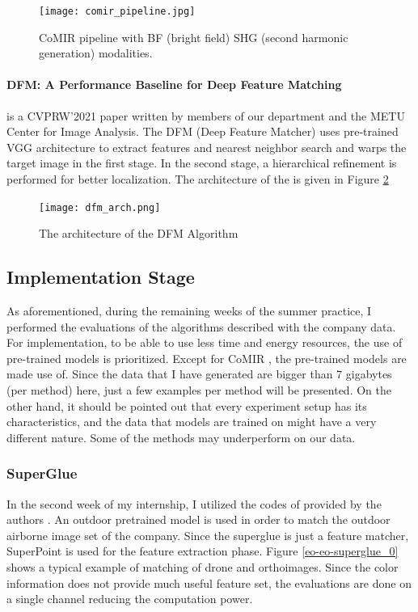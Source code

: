 \documentclass[letterpaper,12pt]{article}
\begin{document}
\begin{figure}[H]
    \centering
    \texttt{[image: comir\_pipeline.jpg]}
    \caption{CoMIR pipeline with BF (bright field) SHG (second harmonic generation) modalities.}
    \label{comir_pip}
\end{figure} 


\paragraph{DFM: A Performance Baseline for Deep Feature Matching}
\cite{Efe_2021_CVPR} is a CVPRW'2021 paper written by members of our department and the METU Center for Image Analysis. The DFM (Deep Feature Matcher) uses pre-trained VGG architecture to extract features and nearest neighbor search and warps the target image in the first stage. In the second stage, a hierarchical refinement is performed for better localization. The architecture of the \cite{Efe_2021_CVPR} is given in Figure \ref{dfm_arch}

\begin{figure}[H]
    \centering
    \texttt{[image: dfm\_arch.png]}
    \caption{The architecture of the DFM Algorithm}
    \label{dfm_arch}
\end{figure} 

\subsection{Implementation Stage}
As aforementioned, during the remaining weeks of the summer practice, I performed the evaluations of the algorithms described with the company data. For implementation, to be able to use less time and energy resources, the use of pre-trained models is prioritized. Except for CoMIR \cite{pielawski2020comir}, the pre-trained models are made use of. Since the data that I have generated are bigger than 7 gigabytes (per method) here, just a few examples per method will be presented. On the other hand, it should be pointed out that every experiment setup has its characteristics, and the data that models are trained on might have a very different nature. Some of the methods may underperform on our data. 

\subsubsection{SuperGlue}
In the second week of my internship, I utilized the codes of \cite{sarlin20superglue} provided by the authors \cite{supergluecode}. An outdoor pretrained model is used in order to match the outdoor airborne image set of the company. Since the superglue is just a feature matcher, SuperPoint \cite{SuperPoint} is used for the feature extraction phase. Figure \ref{eo-eo-superglue_0} shows a typical example of matching of drone and orthoimages. Since the color information does not provide much useful feature set, the evaluations are done on a single channel reducing the computation power. 
\end{document}
